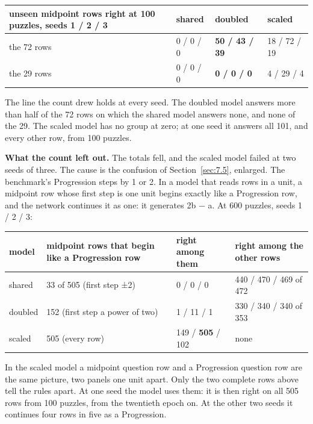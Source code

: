 \begin{center}\small
\begin{tabularx}{\linewidth}{@{}Ylll@{}}
\toprule
unseen midpoint rows right at 100 puzzles, seeds 1 / 2 / 3 & shared & doubled & scaled \\
\midrule
the 72 rows & 0 / 0 / 0 & \textbf{50 / 43 / 39} & 18 / 72 / 19 \\
the 29 rows & 0 / 0 / 0 & \textbf{0 / 0 / 0} & 4 / 29 / 4 \\
\bottomrule
\end{tabularx}
\end{center}

The line the count drew holds at every seed. The doubled model answers more than half of the 72 rows on which the shared model answers none, and none of the 29. The scaled model has no group at zero; at one seed it answers all 101, and every other row, from 100 puzzles.

\textbf{What the count left out.} The totals fell, and the scaled model failed at two seeds of three. The cause is the confusion of Section~\ref{sec:7.5}, enlarged. The benchmark's Progression steps by 1 or 2. In a model that reads rows in a unit, a midpoint row whose first step is one unit begins exactly like a Progression row, and the network continues it as one: it generates 2b − a. At 600 puzzles, seeds 1 / 2 / 3:

\begin{center}\small
\begin{tabularx}{\linewidth}{@{}lYYY@{}}
\toprule
model & midpoint rows that begin like a Progression row & right among them & right among the other rows \\
\midrule
shared & 33 of 505 (first step ±2) & 0 / 0 / 0 & 440 / 470 / 469 of 472 \\
doubled & 152 (first step a power of two) & 1 / 11 / 1 & 330 / 340 / 340 of 353 \\
scaled & 505 (every row) & 149 / \textbf{505} / 102 & none \\
\bottomrule
\end{tabularx}
\end{center}

In the scaled model a midpoint question row and a Progression question row are the same picture, two panels one unit apart. Only the two complete rows above tell the rules apart. At one seed the model uses them: it is then right on all 505 rows from 100 puzzles, from the twentieth epoch on. At the other two seeds it continues four rows in five as a Progression.

